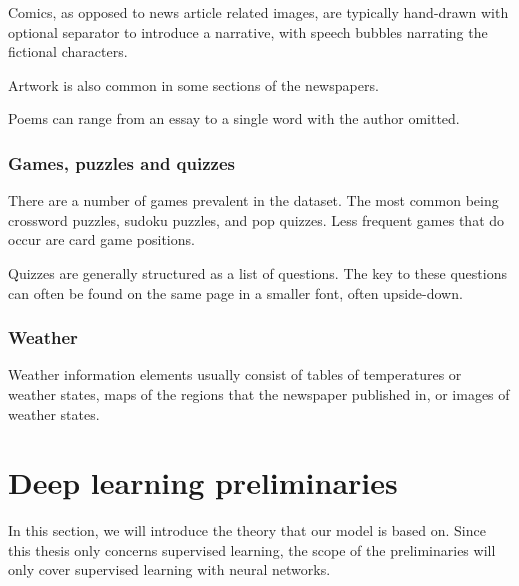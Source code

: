 \documentclass[oneside, english, bibtex]{kththesis}
\begin{document}
Comics, as opposed to news article related images, are typically hand-drawn with optional separator to introduce a narrative, with speech bubbles narrating the fictional characters.

Artwork is also common in some sections of the newspapers.

Poems can range from an essay to a single word with the author omitted.

\subsubsection{Games, puzzles and quizzes}

There are a number of games prevalent in the dataset. The most common being crossword puzzles, sudoku puzzles, and pop quizzes. Less frequent games that do occur are card game positions.

Quizzes are generally structured as a list of questions. The key to these questions can often be found on the same page in a smaller font, often upside-down.

\subsubsection{Weather}

Weather information elements usually consist of tables of temperatures or weather states, maps of the regions that the newspaper published in, or images of weather states.

\section{Deep learning preliminaries}
\label{sec:preliminaries}

In this section, we will introduce the theory that our model is based on. Since this thesis only concerns supervised learning, the scope of the preliminaries will only cover supervised learning with neural networks.


\end{document}
